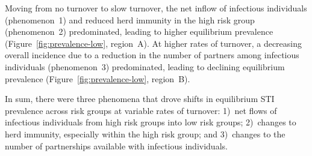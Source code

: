 Moving from no turnover to slow turnover,
the net inflow of infectious individuals (phenomenon~1)
and reduced herd immunity in the high risk group (phenomenon~2)
predominated, leading to higher equilibrium prevalence
(Figure~\ref{fig:prevalence-low}, region~A).
At higher rates of turnover,
a decreasing overall incidence due to
a reduction in the number of partners among infectious individuals (phenomenon~3)
predominated, leading to declining equilibrium prevalence
(Figure~\ref{fig:prevalence-low}, region~B).
\par
In sum, there were three phenomena that
drove shifts in equilibrium STI prevalence across risk groups
at variable rates of turnover:
1)~net flows of infectious individuals from high risk groups into low risk groups;
2)~changes to herd immunity, especially within the high risk group; and
3)~changes to the number of partnerships available with infectious individuals.
